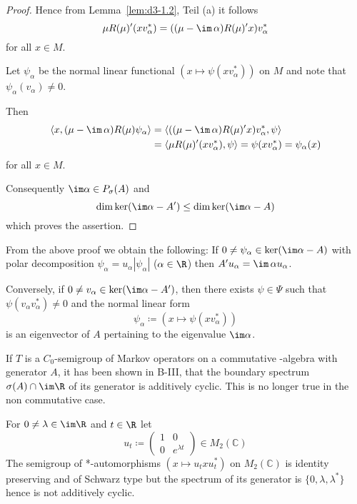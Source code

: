 \begin{proof}

Hence from Lemma~\ref{lem:d3-1.2}, Teil (a) it follows
\[
\mu R(\mu)'(xv_{\alpha}^{*}) = ((\mu - \im\,\alpha)R(\mu)'x)v_{\alpha}^{*}
\]
for all $x \in M$.

Let $\psi_{\alpha}$ be the normal linear functional $(x \mapsto \psi(xv_{\alpha}^{*}))$ on $M$ and note that $\psi_{\alpha}(v_{\alpha}) \neq 0$.

Then
\begin{align*}
\langle x, (\mu - \im\,\alpha)R(\mu)\psi_{\alpha} \rangle &= \langle ((\mu - \im\,\alpha)R(\mu)'x)v_{\alpha}^{*},\psi \rangle \\
&= \langle \mu R(\mu)'(xv_{\alpha}^{*}),\psi \rangle = \psi(xv_{\alpha}^{*}) = \psi_{\alpha}(x)
\end{align*}
for all $x \in M$.

Consequently $\im\alpha \in P_{\sigma}(A)$ and
\[
\dim \ker(\im\alpha - A') \leq \dim \ker(\im\alpha - A)
\]
which proves the assertion.
\end{proof}
\begin{remark}\label{rem:d3-1.9}
From the above proof we obtain the following: If $0 \neq \psi_{\alpha} \in \ker(\im\alpha - A)$ with polar decomposition $\psi_{\alpha} = u_{\alpha}|\psi_{\alpha}|$ ($\alpha \in \R$) then $A'u_{\alpha} = \im\,\alpha u_{\alpha}$.

Conversely, if $0 \neq v_{\alpha} \in \ker(\im\alpha - A')$, then there exists $\psi \in \Psi$ such that $\psi(v_{\alpha}v_{\alpha}^{*}) \neq 0$ and the normal linear form
\[
\psi_{\alpha} \coloneqq (x \mapsto \psi(xv_{\alpha}^{*}))
\]
is an eigenvector of $A$ pertaining to the eigenvalue $\im\alpha$.
\end{remark}

If $T$ is a $C_{0}$-semigroup of Markov operators on a commutative \CA-algebra with generator $A$, it has been shown in B-III, that the boundary spectrum $\sigma(A) \cap \im\R$ of its generator is additively cyclic.
This is no longer true in the non commutative case.

\begin{example}\label{examp:counter}
For $0 \neq \lambda \in \im\R$ and $t \in \R$ let
\[
u_{t} \coloneqq \begin{pmatrix} 1 & 0 \\ 0 & e^{\lambda t} \end{pmatrix} \in M_{2}(\mathbb{C})
\]
The semigroup of *-automorphisms $(x \mapsto u_{t}xu_{t}^{*})$ on $M_{2}(\mathbb{C})$ is identity preserving and of Schwarz type but the spectrum of its generator is $\{0, \lambda, \lambda^{*}\}$ hence is not additively cyclic.
\end{example}
\newpage


